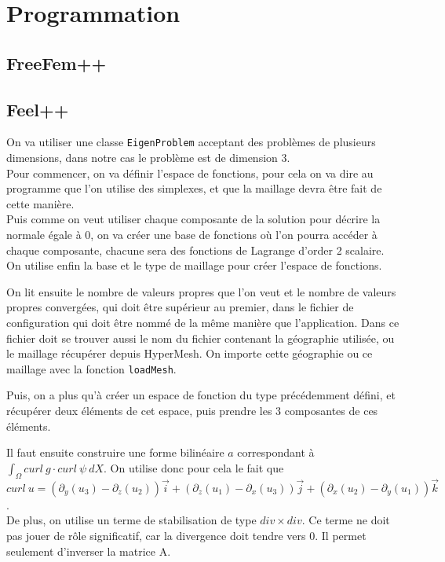 \section{Programmation}
\subsection{FreeFem++}
\subsection{Feel++}

On va utiliser une classe \texttt{EigenProblem} acceptant des problèmes de plusieurs dimensions, dans notre cas le problème est de dimension 3.\\
Pour commencer, on va définir l'espace de fonctions, pour cela on va dire au programme que l'on utilise des simplexes, et que la maillage devra être fait de cette manière.\\
Puis comme on veut utiliser chaque composante de la solution pour décrire la normale égale à 0, on va créer une base de fonctions où l'on pourra accéder à chaque composante, chacune sera des fonctions de Lagrange d'order 2 scalaire.\\
On utilise enfin la base et le type de maillage pour créer l'espace de fonctions.

%


On lit ensuite le nombre de valeurs propres que l'on veut et le nombre de valeurs propres convergées, qui doit être supérieur au premier, dans le fichier de configuration qui doit être nommé de la même manière que l'application. Dans ce fichier doit se trouver aussi le nom du fichier contenant la géographie utilisée, ou le maillage récupérer depuis HyperMesh. On importe cette géographie ou ce maillage avec la fonction \texttt{loadMesh}.

%


Puis, on a plus qu'à créer un espace de fonction du type précédemment défini, et récupérer deux éléments de cet espace, puis prendre les 3 composantes de ces éléments.

%


Il faut ensuite construire une forme bilinéaire $a$ correspondant à $\int_\Omega curl\ g\cdot curl\ \psi\ dX$. On utilise donc pour cela le fait que $curl\ u = (\partial_y(u_3)-\partial_z(u_2))\vec{i} + (\partial_z(u_1) - \partial_x(u_3))\vec{j} + (\partial_x(u_2)-\partial_y(u_1))\vec{k}$.\\
De plus, on utilise un terme de stabilisation de type $div \times div$. Ce terme ne doit pas jouer de rôle significatif, car la divergence doit tendre vers 0. Il permet seulement d'inverser la matrice A.

